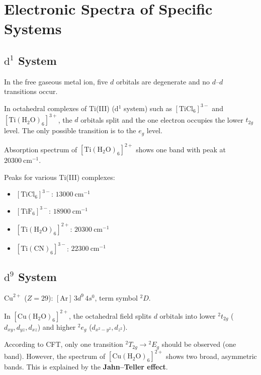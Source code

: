 \documentclass[12pt,a4paper]{article}
\begin{document}
\section{Electronic Spectra of Specific Systems}

\subsection{$\mathrm{d}^1$ System}

In the free gaseous metal ion, five $d$ orbitals are degenerate and no $d$--$d$ transitions occur.

In octahedral complexes of Ti(III) (d$^1$ system) such as $[\mathrm{TiCl}_6]^{3-}$ and $[\mathrm{Ti(H_2O)_6}]^{3+}$, the $d$ orbitals split and the one electron occupies the lower $t_{2g}$ level. The only possible transition is to the $e_g$ level.

Absorption spectrum of $[\mathrm{Ti(H_2O)_6}]^{2+}$ shows one band with peak at $20300\ \mathrm{cm}^{-1}$.

Peaks for various Ti(III) complexes:
\begin{itemize}
  \item $[\mathrm{TiCl_6}]^{3-}$: $13000\ \mathrm{cm}^{-1}$
  \item $[\mathrm{TiF_6}]^{3-}$: $18900\ \mathrm{cm}^{-1}$
  \item $[\mathrm{Ti(H_2O)_6}]^{2+}$: $20300\ \mathrm{cm}^{-1}$
  \item $[\mathrm{Ti(CN)_6}]^{3-}$: $22300\ \mathrm{cm}^{-1}$
\end{itemize}

\subsection{$\mathrm{d}^9$ System}

$\mathrm{Cu}^{2+}$ ($Z=29$): $[\mathrm{Ar}]\,3d^9\,4s^0$, term symbol ${}^2D$.

In $[\mathrm{Cu(H_2O)_6}]^{2+}$, the octahedral field splits $d$ orbitals into lower ${}^2t_{2g}$ ($d_{xy},d_{yz},d_{xz}$) and higher ${}^2e_g$ ($d_{x^2-y^2},d_{z^2}$).

According to CFT, only one transition ${}^2T_{2g} \to {}^2E_g$ should be observed (one band). However, the spectrum of $[\mathrm{Cu(H_2O)_6}]^{2+}$ shows two broad, asymmetric bands. This is explained by the \textbf{Jahn--Teller effect}.
\end{document}
